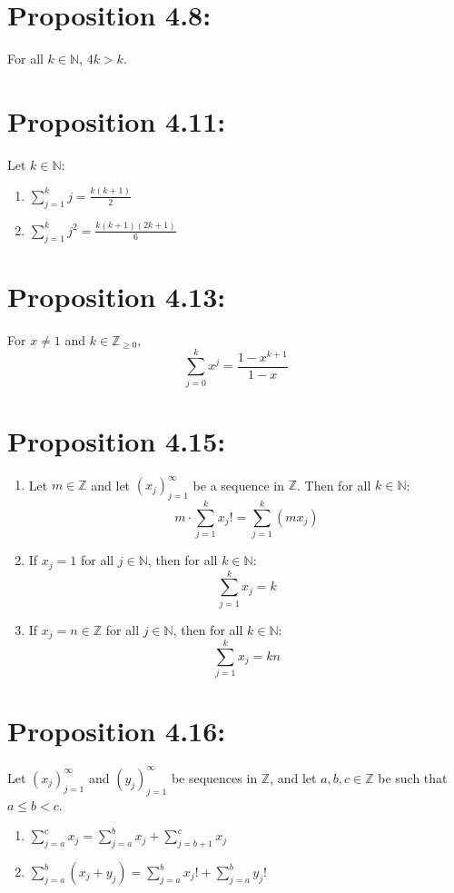 \section*{Proposition 4.8:}
For all $k \in \mathbb{N}$, $4k > k$.

\section*{Proposition 4.11:}
Let $k \in \mathbb{N}$:
\begin{enumerate}
    \item $\sum_{j=1}^k j = \frac{k(k+1)}{2}$
    \item $\sum_{j=1}^k j^2 = \frac{k(k+1)(2k+1)}{6}$
\end{enumerate}

\section*{Proposition 4.13:}
For $x \neq 1$ and $k \in \mathbb{Z}_{\geq 0}$,
\[ \sum_{j=0}^k x^j = \frac{1 - x^{k+1}}{1 - x} \]

\section*{Proposition 4.15:}
\begin{enumerate}
    \item Let $m \in \mathbb{Z}$ and let $(x_j)_{j=1}^{\infty}$ be a sequence in $\mathbb{Z}$. Then for all $k \in \mathbb{N}$:
    \[ m \cdot \sum_{j=1}^k x_j! = \sum_{j=1}^k (mx_j) \]
    \item If $x_j = 1$ for all $j \in \mathbb{N}$, then for all $k \in \mathbb{N}$:
    \[ \sum_{j=1}^k x_j = k \]
    \item If $x_j = n \in \mathbb{Z}$ for all $j \in \mathbb{N}$, then for all $k \in \mathbb{N}$:
    \[ \sum_{j=1}^k x_j = kn \]
\end{enumerate}


\section*{Proposition 4.16:}
Let $(x_j)_{j=1}^{\infty}$ and $(y_j)_{j=1}^{\infty}$ be sequences in $\mathbb{Z}$, and let $a,b,c \in \mathbb{Z}$ be such that $a \leq b < c$.
\begin{enumerate}
    \item $\displaystyle\sum_{j=a}^{c} x_j = \displaystyle\sum_{j=a}^{b} x_j + \displaystyle\sum_{j=b+1}^{c} x_j$
    \item $\displaystyle\sum_{j=a}^{b} (x_j + y_j) = \displaystyle\sum_{j=a}^{b} x_j! + \displaystyle\sum_{j=a}^{b} y_j!$
\end{enumerate}

